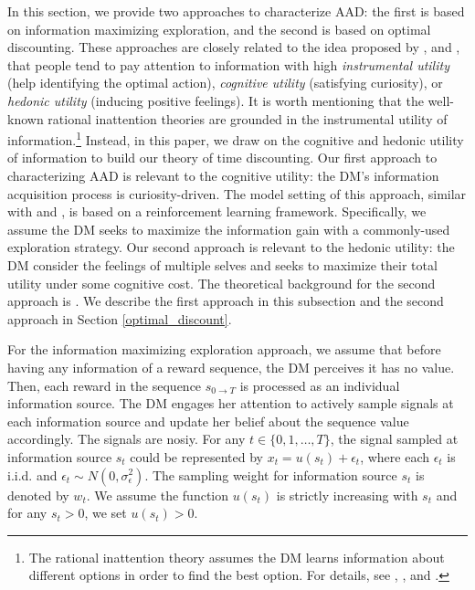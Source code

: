 \documentclass[
  12pt,
]{article}
\begin{document}
In this section, we provide two approaches to characterize AAD: the
first is based on information maximizing exploration, and the second is
based on optimal discounting. These approaches are closely related to
the idea proposed by \citet{gottlieb2012attention},
\citet{gottlieb2013information} and \citet{sharot2020people}, that
people tend to pay attention to information with high \emph{instrumental
utility} (help identifying the optimal action), \emph{cognitive utility}
(satisfying curiosity), or \emph{hedonic utility} (inducing positive
feelings). It is worth mentioning that the well-known rational
inattention theories are grounded in the instrumental utility of
information.\footnote{The rational inattention theory assumes the DM
  learns information about different options in order to find the best
  option. For details, see \citet{sims2003implications},
  \citet{matvejka2015rational}, and \citet{mackowiak2023rational}.}
Instead, in this paper, we draw on the cognitive and hedonic utility of
information to build our theory of time discounting. Our first approach
to characterizing AAD is relevant to the cognitive utility: the DM's
information acquisition process is curiosity-driven. The model setting
of this approach, similar with \citet{gottlieb2012attention} and
\citet{gottlieb2013information}, is based on a reinforcement learning
framework. Specifically, we assume the DM seeks to maximize the
information gain with a commonly-used exploration strategy. Our second
approach is relevant to the hedonic utility: the DM consider the
feelings of multiple selves and seeks to maximize their total utility
under some cognitive cost. The theoretical background for the second
approach is \citet{noor2022optimal,noor2024constrained}. We describe the
first approach in this subsection and the second approach in Section
\ref{optimal_discount}.

For the information maximizing exploration approach, we assume that
before having any information of a reward sequence, the DM perceives it
has no value. Then, each reward in the sequence \(s_{0\rightarrow T}\)
is processed as an individual information source. The DM engages her
attention to actively sample signals at each information source and
update her belief about the sequence value accordingly. The signals are
nosiy. For any \(t\in\{0,1,…,T\}\), the signal sampled at information
source \(s_t\) could be represented by \(x_t =u(s_t)+\epsilon_t\), where
each \(\epsilon_t\) is i.i.d. and
\(\epsilon_t \sim N(0,\sigma_\epsilon^2)\). The sampling weight for
information source \(s_t\) is denoted by \(w_t\). We assume the function
\(u(s_t)\) is strictly increasing with \(s_t\) and for any \(s_t>0\), we
set \(u(s_t)>0\).
\end{document}
